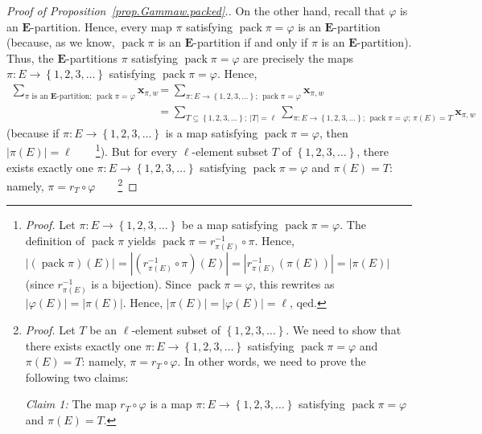 \documentclass[12pt]{article}
\theoremstyle{plain}
\theoremstyle{definition}
\theoremstyle{remark}
\let\sumnonlimits\sum
\renewcommand{\sum}{\sumnonlimits\limits}
\newcommand{\xx}{{\mathbf{x}}}
\newcommand{\pack}{\operatorname{pack}}
\newcommand{\EE}{{\mathbf{E}}}
\begin{document}
\begin{proof}[Proof of Proposition~\ref{prop.Gammaw.packed}.]
On the other hand, recall that $\varphi$ is an $\EE$-partition.
Hence, every map $\pi$ satisfying $\pack \pi = \varphi$
is an $\EE$-partition (because, as we know, $\pack \pi$ is an
$\EE$-partition if and only if $\pi$ is an $\EE$-partition).
Thus, the $\EE$-partitions $\pi$ satisfying
$\pack \pi = \varphi$ are precisely the maps
$\pi : E \to \left\{1, 2, 3, \ldots\right\}$ satisfying
$\pack \pi = \varphi$. Hence,
\begin{align*}
\sum_{\pi\text{ is an }\EE\text{-partition; } \pack \pi = \varphi}
\xx_{\pi, w}
&= \sum_{\pi : E \to \left\{1, 2, 3, \ldots\right\} \text{; } \pack \pi = \varphi}
\xx_{\pi, w} \\
&= \sum_{T \subseteq \left\{1, 2, 3, \ldots\right\} ; \ \left|T\right| = \ell}
\sum_{\pi : E \to \left\{1, 2, 3, \ldots\right\} \text{; } \pack \pi = \varphi
\text{; } \pi\left(E\right) = T}
\xx_{\pi, w}
\end{align*}
(because if $\pi : E \to \left\{1, 2, 3, \ldots\right\}$ is a map
satisfying $\pack \pi = \varphi$, then
$\left|\pi\left(E\right)\right| = \ell$\ \ \ \ \footnote{\textit{Proof.}
Let $\pi : E \to \left\{1, 2, 3, \ldots\right\}$ be a map
satisfying $\pack \pi = \varphi$. The definition of $\pack \pi$
yields $\pack \pi = r_{\pi\left(E\right)}^{-1} \circ \pi$. Hence,
$\left|\left(\pack \pi\right)\left(E\right)\right|
= \left|\left(r_{\pi\left(E\right)}^{-1} \circ \pi\right)\left(E\right)\right|
= \left|r_{\pi\left(E\right)}^{-1} \left(\pi\left(E\right)\right)\right|
= \left|\pi\left(E\right)\right|$
(since $r_{\pi\left(E\right)}^{-1}$ is a bijection). Since
$\pack \pi = \varphi$, this rewrites as
$\left|\varphi\left(E\right)\right| = \left|\pi\left(E\right)\right|$.
Hence, $ \left|\pi\left(E\right)\right|
= \left|\varphi\left(E\right)\right| = \ell$, qed.}). But for every
$\ell$-element subset $T$ of
$\left\{1, 2, 3, \ldots\right\}$, there exists exactly
one $\pi : E \to \left\{1, 2, 3, \ldots\right\}$ satisfying
$\pack \pi = \varphi$ and $\pi\left(E\right) = T$: namely,
$\pi = r_T \circ \varphi$\ \ \ \ \footnote{\textit{Proof.}
Let $T$ be an $\ell$-element subset of $\left\{
1,2,3,\ldots\right\}  $. We need to show that there exists exactly one
$\pi:E\rightarrow\left\{  1,2,3,\ldots\right\}  $ satisfying
$\operatorname{pack}\pi=\varphi$ and $\pi\left(  E\right)  =T$: namely,
$\pi=r_{T}\circ\varphi$. In other words, we need to prove the following two claims:

\textit{Claim 1:} The map $r_{T}\circ\varphi$ is a map $\pi:E\rightarrow
\left\{  1,2,3,\ldots\right\}  $ satisfying $\operatorname{pack}\pi=\varphi$
and $\pi\left(  E\right)  =T$.

}
\end{proof}
\end{document}
